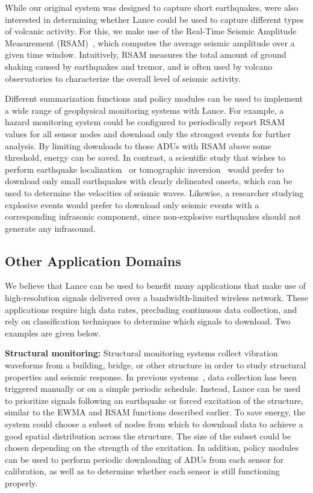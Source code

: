 While our original system was designed to capture short earthquakes, were
also interested in determining whether Lance could be used to capture
different types of volcanic activity. For this, we make use of the Real-Time
Seismic Amplitude Measurement (RSAM)~\cite{rsam}, which computes the average
seismic amplitude over a given time window.  Intuitively, RSAM measures the
total amount of ground shaking caused by earthquakes and tremor, and is often
used by volcano observatories to characterize the overall level of seismic
activity.

Different summarization functions and policy modules can be used to implement
a wide range of geophysical monitoring systems with Lance. For example, a
hazard monitoring system could be configured to periodically report RSAM
values for all sensor nodes and download only the strongest events for
further analysis. By limiting downloads to those ADUs with RSAM above some
threshold, energy can be saved. In contrast, a scientific study that wishes
to perform earthquake localization~\cite{aki-richards-80} or tomographic
inversion~\cite{lees-lindley-94} would prefer to download only small
earthquakes with clearly delineated onsets, which can be used to determine
the velocities of seismic waves. Likewise, a researcher studying explosive
events would prefer to download only seismic events with a corresponding
infrasonic component, since non-explosive earthquakes should not generate any
infrasound.

%
\subsection{Other Application Domains}

We believe that Lance can be used to benefit many applications that make use
of high-resolution signals delivered over a bandwidth-limited wireless
network. These applications require high data rates, precluding continuous
data collection, and rely on classification techniques to determine which
signals to download. Two examples are given below.

{\bf Structural monitoring:}
Structural monitoring systems collect vibration
waveforms from a building, bridge, or other structure in order to
study structural properties and seismic response.
In previous systems~\cite{netshm-emnets05,ggb-ipsn07}, data collection
has been triggered manually or on a simple periodic schedule. Instead,
Lance can be used to prioritize signals following an earthquake or 
forced excitation of the structure, similar to the EWMA and RSAM
functions described earlier. To save energy, the system could choose a
subset of nodes from which to download data to achieve a good spatial
distribution across the structure. The size of the subset could be
chosen depending on the strength of the excitation. In addition, 
policy modules can be used to perform periodic downloading of ADUs 
from each sensor for calibration, as well as to determine whether 
each sensor is still functioning properly.

